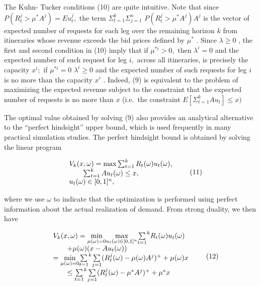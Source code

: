The Kuhn- Tucker conditions (10) are quite intuitive. Note that since
\(P(R_{t}^{j} > \mu^{*}A^{j}) = E u_{t}^{j},\) the term
\(\Sigma_{t = 1}^{k}\Sigma_{j = 1}^{n}\)
\(P(R_{t}^{j} > \mu^{*}A^{j})A^{j}\) is the vector of expected number of
requests for each leg over the remaining horizon \(k\) from itineraries
whose revenue exceeds the bid prices defined by \(\mu^{*}\) . Since
\(\lambda \geq 0\) , the first and second condition in (10) imply that
if \(\mu^{*i} > 0,\) then \(\lambda^{i} = 0\) and the expected number of
such request for leg \(i,\) across all itineraries, is precisely the
capacity \(x^{i};\) if \(\mu^{*i} = 0\) \(\lambda^{i}\geq 0\) and the
expected number of such requests for leg \(i\) is no more than the
capacity \(x^{i}\) . Indeed, (9) is equivalent to the problem of
maximizing the expected revenue subject to the constraint that the
expected number of requests is no more than \(x\) (i.e.~the constraint
\(E[\Sigma_{t = 1}^{k}A u_{t}]\leq x)\)

The optimal value obtained by solving (9) also provides an analytical
alternative to the ``perfect hindsight'' upper bound, which is used
frequently in many practical simulation studies. The perfect hindsight
bound is obtained by solving the linear program

\[
\begin{array}{r l} & {V_{k}(x,\omega) = \max \sum_{t = 1}^{k}R_{t}(\omega)u_{t}(\omega),}\\ & {\qquad \sum_{t = 1}^{k}A u_{t}(\omega)\leq x,}\\ & {u_{t}(\omega)\in [0,1]^{n},} \end{array} \tag{11}
\]

where we use \(\omega\) to indicate that the optimization is performed
using perfect information about the actual realization of demand. From
strong duality, we then have

\[
\begin{array}{r l} & {V_{k}(x,\omega) = \underset {\mu (\omega) = 0}{\min}\underset {u_{t}(\omega)\in [0,1]^{n}}{\max}\underset {t = 1}{\sum}^{k}R_{t}(\omega)u_{t}(\omega)}\\ & {\qquad +\mu (\omega)(x - A u_{t}(\omega))}\\ & {= \underset {\mu (\omega) = 0}{\min}\underset {t = 1}{\sum}^{k}\underset {j = 1}{\sum}(R_{t}^{j}(\omega) - \mu (\omega)A^{j})^{+} + \mu (\omega)x}\\ & {\qquad \leq \underset {t = 1}{\sum}^{k}\underset {j = 1}{\sum}(R_{t}^{j}(\omega) - \mu^{*}A^{j})^{+} + \mu^{*}x} \end{array} \tag{12}
\]

